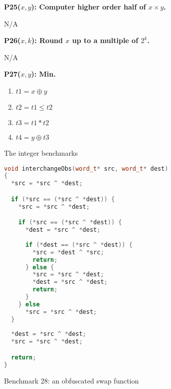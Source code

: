 \begin{figure}
\begin{multicols}{4}
   \begin{minipage}{.2\textwidth}
   {\bf P25($x, y$): Computer higher order half of $x \times y$.}

    N/A
   \end{minipage}

   \vspace{12pt}

   \begin{minipage}{.2\textwidth}
   {\bf P26($x, k$): Round $x$ up to a multiple of $2^k$.}

N/A
   \end{minipage}

      \vspace{12pt}
   
   \begin{minipage}{.2\textwidth}
   {\bf P27($x, y$): Min.}
    \begin{enumerate}
     \item $t1 = x \oplus y$
     \item $t2 = t1 \leq t2$
     \item $t3 = t1 * t2$
     \item $t4 = y \oplus t3$
    \end{enumerate}
   \end{minipage}

   
 \end{multicols}

 \caption{The integer benchmarks}
\end{figure}

\begin{figure}
 \begin{lstlisting}[language=C++]
void interchangeObs(word_t* src, word_t* dest)
{
  *src = *src ^ *dest;

  if (*src == (*src ^ *dest)) {
    *src = *src ^ *dest;

    if (*src == (*src ^ *dest)) {
      *dest = *src ^ *dest;
      
      if (*dest == (*src ^ *dest)) {
        *src = *dest ^ *src;
        return;
      } else {
        *src = *src ^ *dest;
        *dest = *src ^ *dest;
        return;
      } 
    } else
      *src = *src ^ *dest;
  }
  
  *dest = *src ^ *dest;
  *src = *src ^ *dest;

  return;
}
 \end{lstlisting}

 \caption{Benchmark 28: an obfuscated swap function}
\end{figure}


